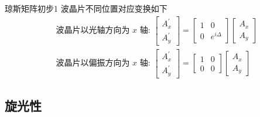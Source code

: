 \begin{myprop}{ 琼斯矩阵初步}{1}
	波晶片不同位置对应变换如下
	\[
		\begin{aligned}
			&\text { 波晶片以光轴方向为 } x \text { 轴: }\left[\begin{array}{l}
				A_x^{\prime} \\
				A_y^{\prime}
				\end{array}\right]=\left[\begin{array}{cc}
				1 & 0 \\
				0 & e^{i \Delta}
				\end{array}\right]\left[\begin{array}{l}
				A_x \\
				A_y
				\end{array}\right]\\
			&\text { 波晶片以偏振方向为 } x \text { 轴: }\left[\begin{array}{c}
				A_x^{\prime} \\
				A_y^{\prime}
				\end{array}\right]=\left[\begin{array}{ll}
				1 & 0 \\
				0 & 0
				\end{array}\right]\left[\begin{array}{c}
				A_x \\
				A_y
				\end{array}\right]
		\end{aligned}	
	\]
\end{myprop}
\subsection{旋光性}

